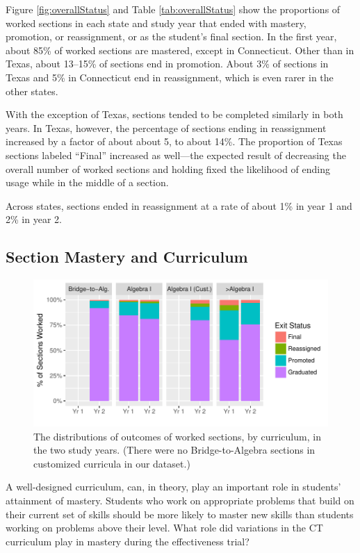 \documentclass[12pt]{article}\usepackage[]{graphicx}\usepackage[]{color}
\makeatletter
\def\maxwidth{ %
  \ifdim\Gin@nat@width>\linewidth
    \linewidth
  \else
    \Gin@nat@width
  \fi
}
\makeatother
\begin{document}
Figure \ref{fig:overallStatus} and Table \ref{tab:overallStatus} show
the proportions of worked sections in each state and study year that
ended with mastery, promotion, or reassignment, or as the
student's final section.
In the first year, about
85\% of
worked sections are mastered, except in Connecticut.
Other than in Texas, about
13--15\%
of sections end in promotion.
About 3\% of sections in Texas
and 5\%
in Connecticut end in reassignment, which is even rarer in the other states.

With the exception of Texas, sections tended to be completed similarly
in both years.
In Texas, however, the percentage of sections ending in reassignment increased by a factor
of about about
5,
to about 14\%.
The proportion of Texas sections labeled ``Final'' increased as
well---the expected result of decreasing the overall number of worked
sections and holding fixed the likelihood of ending
usage while in the middle of a section.

Across states, sections ended in reassignment at a rate of about
1\% in year 1 and
2\% in year 2.

\subsection{Section Mastery and Curriculum}
\begin{figure}
  \centering

\includegraphics[width=\maxwidth]{figure/statusCur-1} 

\caption{The distributions of outcomes of worked sections, by
  curriculum, in the two study years. (There were no Bridge-to-Algebra
sections in customized curricula in our dataset.)}
\label{fig:statusCur}
\end{figure}

A well-designed curriculum, can, in theory, play an important role in
students' attainment of mastery.
Students who work on appropriate problems that build on their current
set of skills should be more likely to master new skills than students
working on problems above their level.
What role did variations in the CT curriculum play in mastery during the effectiveness trial?
\end{document}
